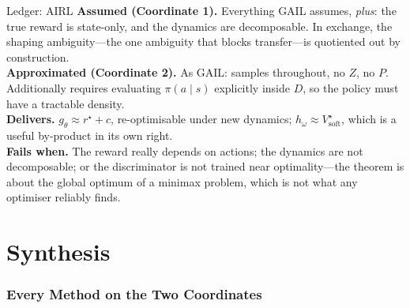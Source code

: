 \documentclass[11pt]{article}
\theoremstyle{plain}
\theoremstyle{definition}
\theoremstyle{remark}
\newcommand{\soft}{\mathrm{soft}}
\begin{document}
\begin{navybox}{Ledger: AIRL}
\textbf{Assumed (Coordinate 1).} Everything GAIL assumes, \emph{plus}: the
true reward is state-only, and the dynamics are decomposable. In exchange,
the shaping ambiguity---the one ambiguity that blocks transfer---is
quotiented out by construction.\\
\textbf{Approximated (Coordinate 2).} As GAIL: samples throughout, no $Z$,
no $P$. Additionally requires evaluating $\pi(a\mid s)$ explicitly inside
$D$, so the policy must have a tractable density.\\
\textbf{Delivers.} $g_\theta \approx r^\star + c$, re-optimisable under
new dynamics; $h_\omega \approx V^\star_\soft$, which is a useful
by-product in its own right.\\
\textbf{Fails when.} The reward really depends on actions; the dynamics
are not decomposable; or the discriminator is not trained near
optimality---the theorem is about the global optimum of a minimax problem,
which is not what any optimiser reliably finds.
\end{navybox}

\clearpage
\part{Synthesis}\label{part:synthesis}

\section{Every Method on the Two Coordinates}
\end{document}
